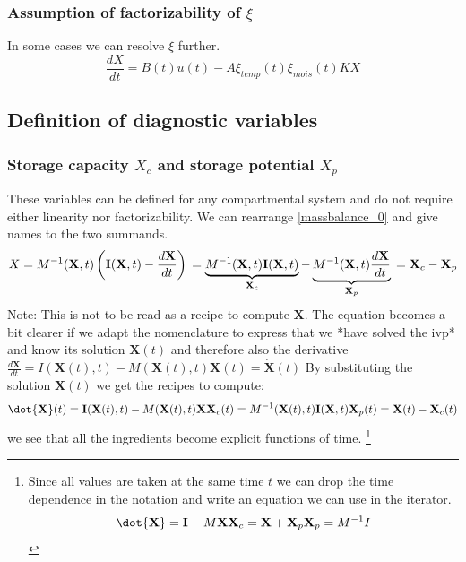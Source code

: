 \documentclass[journal abbreviation, manuscript]{copernicus}
\theoremstyle{definition}
\newcommand{\X}{\mathbf{X}}
\newcommand{\I}{\mathbf{I}}
\begin{document}
\subsubsection{Assumption of factorizability of $\xi$} 
In some cases we can resolve $\xi$ further.
$$
\frac{d X}{d t} = B(t)u(t) - A \xi_{temp}(t) \xi_{mois}(t) K X  
$$







\subsection{Definition of diagnostic variables}

\subsubsection{Storage capacity $X_c$ and storage potential $X_p$}
These variables can be defined for any compartmental system and do not require either linearity nor factorizability. 
We can rearrange \eqref{massbalance_0} and give names to the two summands. 
$$
X = M^{-1}(\X,t) \left(\I(\X,t)- \frac{d \X}{d t} \right) \\ 
  = \underbrace{M^{-1}(\X,t)\I(\X,t)}_{\X_c} - \underbrace{M^{-1}(\X,t) \frac{d \X}{d t} }_{\X_p} \\
  = \X_c - \X_p
$$
Note:
This is not to be read as a recipe to compute $\X$.
The equation becomes a bit clearer if we adapt the nomenclature to express that we *have solved the ivp* and know its solution $\X(t)$  
and therefore also  the derivative $\frac{d \X}{d t}=I(\X(t),t) - M(\X(t),t) \X(t) =\dot{\X}(t)$ 
By substituting the solution $\X(t)$ we get the recipes to compute:
$$
\dot{\X}(t) = \I(\X(t),t) - M(\X(t),t) \X \\
\X_c(t) = M^{-1}(\X(t),t)\I(\X,t) \\ 
\X_p(t) = \X(t)-\X_c(t) \\ 
$$
we see that all the ingredients become explicit functions of time.   
\footnote{
  Since all values are taken at the same time $t$ we can drop the time dependence
  in the notation and write an equation we can use in the iterator.
  $$
  \dot{\X} = \I - M \X \\
  \X_c = \X + \X_p \\ 
  \X_p = M^{-1}I  \\ 
  $$
}
\end{document}
